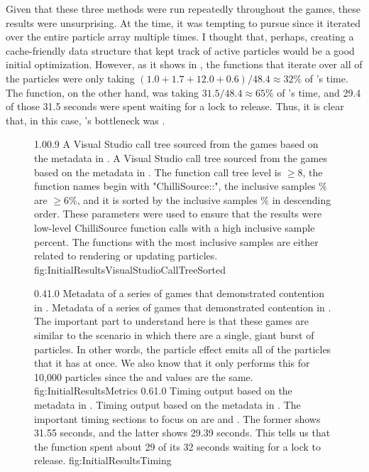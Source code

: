 Given that these three methods were run repeatedly throughout the games, these results were unsurprising. At the time, it was tempting to pursue  since it iterated over the entire particle array multiple times. I thought that, perhaps, creating a cache-friendly data structure that kept track of active particles would be a good initial optimization. However, as it shows in , the functions that iterate over all of the particles were only taking $ (1.0 + 1.7 + 12.0 + 0.6)/48.4 \approx 32\% $ of 's time. The  function, on the other hand, was taking $ 31.5 / 48.4 \approx 65\% $ of 's time, and 29.4 of those 31.5 seconds were spent waiting for a lock to release. Thus, it is clear that, in this case, 's bottleneck was . 

\begin{figure}
\addtocounter{figure}{-1}

	\vspace{-1.5cm}
	{1.0}{0.9}
	{A Visual Studio call tree sourced from the games based on the metadata in .}
	{A Visual Studio call tree sourced from the games based on the metadata in . The function call tree level is $ \geq 8 $, the function names begin with "ChilliSource::", the inclusive samples \% are $ \geq 6\% $, and it is sorted by the inclusive samples \% in descending order. These parameters were used to ensure that the results were low-level ChilliSource function calls with a high inclusive sample percent. The functions with the most inclusive samples are either related to rendering or updating particles.}
	{fig:InitialResultsVisualStudioCallTreeSorted}

	{0.4}{1.0}
	{Metadata of a series of games that demonstrated contention in \newline {}.}
	{Metadata of a series of games that demonstrated contention in . The important part to understand here is that these games are similar to the scenario in which there are a single, giant burst of particles. In other words, the particle effect emits all of the particles that it has at once. We also know that it only performs this for 10,000 particles since the  and  values are the same.}
	{fig:InitialResultsMetrics}
	{0.6}{1.0}
	{Timing output based on the metadata in .}
	{Timing output based on the metadata in . The important timing sections to focus on are  and . The former shows 31.55 seconds, and the latter shows 29.39 seconds. This tells us that the  function spent about 29 of its 32 seconds waiting for a lock to release.}
	{fig:InitialResultsTiming}
\end{figure}

